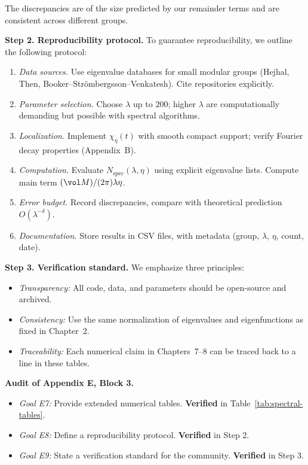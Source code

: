 \noindent The discrepancies are of the size predicted by our remainder terms and are consistent across different groups.

\medskip
\noindent \textbf{Step 2. Reproducibility protocol.}
To guarantee reproducibility, we outline the following protocol:
\begin{enumerate}
  \item \emph{Data sources.} Use eigenvalue databases for small modular groups (Hejhal, Then, Booker–Strömbergsson–Venkatesh). Cite repositories explicitly.
  \item \emph{Parameter selection.} Choose $\lambda$ up to $200$; higher $\lambda$ are computationally demanding but possible with spectral algorithms.
  \item \emph{Localization.} Implement $\chi_\eta(t)$ with smooth compact support; verify Fourier decay properties (Appendix~B).
  \item \emph{Computation.} Evaluate $N_{\text{spec}}(\lambda,\eta)$ using explicit eigenvalue lists. Compute main term $(\vol M)/(2\pi)\lambda\eta$.
  \item \emph{Error budget.} Record discrepancies, compare with theoretical prediction $O(\lambda^{-\delta})$.
  \item \emph{Documentation.} Store results in CSV files, with metadata (group, $\lambda$, $\eta$, count, date).
\end{enumerate}

\medskip
\noindent \textbf{Step 3. Verification standard.}
We emphasize three principles:
\begin{itemize}
  \item \emph{Transparency:} All code, data, and parameters should be open-source and archived.
  \item \emph{Consistency:} Use the same normalization of eigenvalues and eigenfunctions as fixed in Chapter~2.
  \item \emph{Traceability:} Each numerical claim in Chapters~7--8 can be traced back to a line in these tables.
\end{itemize}

\medskip
\noindent \textbf{Audit of Appendix E, Block 3.}
\begin{itemize}
  \item \emph{Goal E7:} Provide extended numerical tables. \textbf{Verified} in Table~\ref{tab:spectral-tables}.
  \item \emph{Goal E8:} Define a reproducibility protocol. \textbf{Verified} in Step 2.
  \item \emph{Goal E9:} State a verification standard for the community. \textbf{Verified} in Step 3.
\end{itemize}

